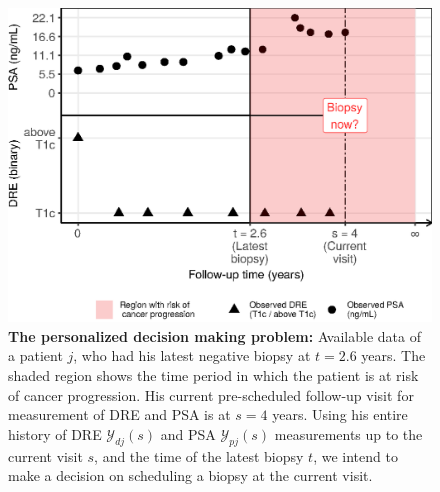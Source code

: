 \begin{figure}[!htb]
\captionsetup{justification=justified}
\centerline{\includegraphics[width=\columnwidth]{images/obsDataPlot_2340.eps}}
\caption{\textbf{The personalized decision making problem:} Available data of a patient $j$, who had his latest negative biopsy at $t=2.6$ years. The shaded region shows the time period in which the patient is at risk of cancer progression. His current pre-scheduled follow-up visit for measurement of DRE and PSA is at $s=4$ years. Using his entire history of DRE $\mathcal{Y}_{dj}(s)$ and PSA $\mathcal{Y}_{pj}(s)$ measurements up to the current visit $s$, and the time of the latest biopsy $t$, we intend to make a decision on scheduling a biopsy at the current visit.}
\label{fig:obsDataPlot_2340}
\end{figure}

